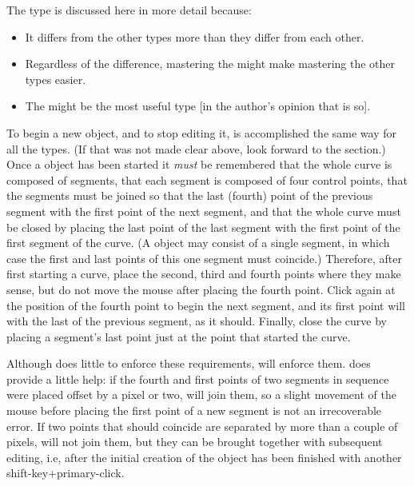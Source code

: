 			The \IXbezn{} \IXspline{} type is discussed here in more detail
			because:
			
			\begin{itemize}
				\item It differs from the other types more
						than they differ from each other.
				\item Regardless of the difference, mastering
						the \IXbezn{} might make mastering the
						other types easier.
				\item The \IXbezn{} might be the most
						useful type [in the author's opinion
						that is so].
			\end{itemize}
			
			To begin a new object, and to stop editing it,
			is accomplished the same way for all the \IXspline{} types.
			(If that was not made
			clear above, look forward to the
			 section.)
			Once a \IXbezn{} \IXspline{} object has been started
			it \emph{must} be remembered that the whole
			curve is composed of segments, that each segment
			is composed of four control points, that the
			segments must be joined so that the last (fourth) point
			of the previous segment  with
			the first point of the next segment,
			and that the whole curve must be closed by
			placing the last point of the last segment
			 with the first point
			of the first segment of the curve.
			(A \IXbezn{} \IXspline{} object
			may consist of a single segment, in which case
			the first and last points of this one segment
			must coincide.) Therefore, after first starting
			a \IXbezn{} curve, place the second, third and
			fourth points where they make sense, but do not
			move the mouse after placing the fourth point.
			Click again at the position of the fourth point
			to begin the next segment, and its
			first point will  with the
			last of the previous segment, as it should.
			Finally, close the curve by placing a segment's
			last point just at the point that started the curve.
			
			Although \IXpkg{} does little to enforce these
			requirements, \IXpov{} will enforce them.
			\IXpkgu{} does provide a little help: if the
			fourth and first points of two segments in
			sequence were placed offset by a pixel or two,
			\IXpkg{} will join them, so a slight movement
			of the mouse before placing the first point
			of a new segment is not an irrecoverable error.
			If two points that should coincide are separated
			by more than a couple of pixels,
			\IXpkg{} will not join them, but they can be brought
			together with subsequent editing, i.e, after the
			initial creation of the object has been
			finished with another shift-key+primary-click.
			
